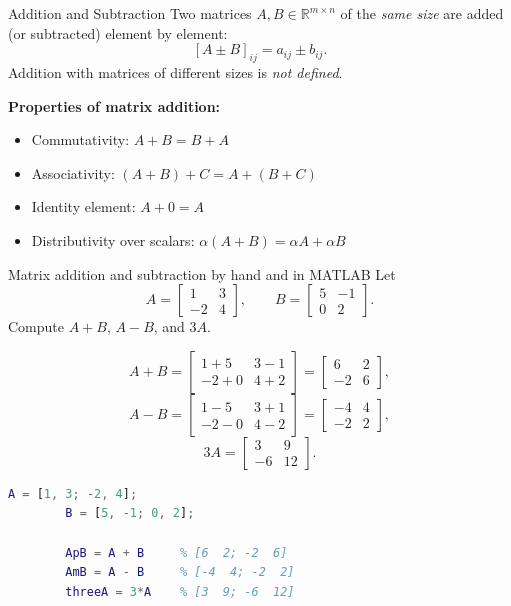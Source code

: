 \begin{defnbox}{Addition and Subtraction}
	Two matrices $A, B \in \mathbb{R}^{m \times n}$ of the \emph{same
		size} are added (or subtracted) element by element:
	\[
	[A \pm B]_{ij} = a_{ij} \pm b_{ij}.
	\]
	Addition with matrices of different sizes is \emph{not defined}.
\end{defnbox}

\textbf{Properties of matrix addition:}
\begin{itemize}[noitemsep]
	\item Commutativity: $A + B = B + A$
	\item Associativity: $(A + B) + C = A + (B + C)$
	\item Identity element: $A + 0 = A$
	\item Distributivity over scalars: $\alpha(A+B) = \alpha A + \alpha B$
\end{itemize}

\begin{examplebox}{Matrix addition and subtraction by hand and in MATLAB}
	Let
	\[
	A = \begin{bmatrix} 1 & 3 \\ -2 & 4 \end{bmatrix},
	\qquad
	B = \begin{bmatrix} 5 & -1 \\ 0 & 2 \end{bmatrix}.
	\]
	Compute $A + B$, $A - B$, and $3A$.
	
	\solution
	\[
	A + B =
	\begin{bmatrix} 1+5 & 3-1 \\ -2+0 & 4+2 \end{bmatrix}
	= \begin{bmatrix} 6 & 2 \\ -2 & 6 \end{bmatrix},
	\]
	\[
	A - B =
	\begin{bmatrix} 1-5 & 3+1 \\ -2-0 & 4-2 \end{bmatrix}
	= \begin{bmatrix} -4 & 4 \\ -2 & 2 \end{bmatrix},
	\]
	\[
	3A =
	\begin{bmatrix} 3 & 9 \\ -6 & 12 \end{bmatrix}.
	\]
	
	\begin{lstlisting}[language=Matlab]
		A = [1, 3; -2, 4];
		B = [5, -1; 0, 2];
		
		ApB = A + B     % [6  2; -2  6]
		AmB = A - B     % [-4  4; -2  2]
		threeA = 3*A    % [3  9; -6  12]
	\end{lstlisting}
\end{examplebox}

